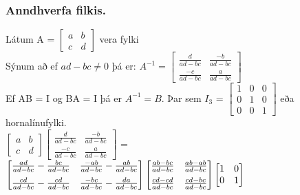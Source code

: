 \subsubsection{Anndhverfa filkis.}
Látum A = $\begin{bmatrix}
    a & b \\
    c & d 
\end{bmatrix}$ vera fylki\vspace*{1em} \\
Sýnum að ef $ad-bc \not = 0$ þá er: $A^{-1} = 
\begin{bmatrix}
    \frac{d}{ad-bc} & \frac{-b}{ad-bc} \\
    \frac{-c}{ad-bc} & \frac{a}{ad-bc} 
\end{bmatrix}$\vspace*{1em} \\
Ef AB = I og BA = I þá er $A^{-1} = B$. Þar sem $I_3$ = 
$\begin{bmatrix}
    1 & 0 & 0 \\
    0 & 1 & 0 \\ 
    0 & 0 & 1
\end{bmatrix}$ eða hornalínufylki.\vspace*{1em}\\
$\begin{bmatrix}
    a & b \\
    c & d 
\end{bmatrix}
\begin{bmatrix}
    \frac{d}{ad-bc} & \frac{-b}{ad-bc} \\
    \frac{-c}{ad-bc} & \frac{a}{ad-bc} 
\end{bmatrix}$ = 
$\begin{bmatrix}
    \frac{ad}{ad-bc} - \frac{bc}{ad-bc} & \frac{-ab}{ad-bc} - \frac{ab}{ad-bc}\vspace*{0.5em} \\
    \frac{cd}{ad-bc} - \frac{cd}{ad-bc} & \frac{-bc}{ad-bc} - \frac{da}{ad-bc}
\end{bmatrix}
\begin{bmatrix}
    \frac{ab-bc}{ad-bc} & \frac{ab-ab}{ad-bc}\vspace*{0.5em} \\
    \frac{cd-cd}{ad-bc} & \frac{cd-bc}{ad-bc}
\end{bmatrix}
\begin{bmatrix}
    1 & 0 \\
    0 & 1 \\
\end{bmatrix}$\vspace*{1em} \\

